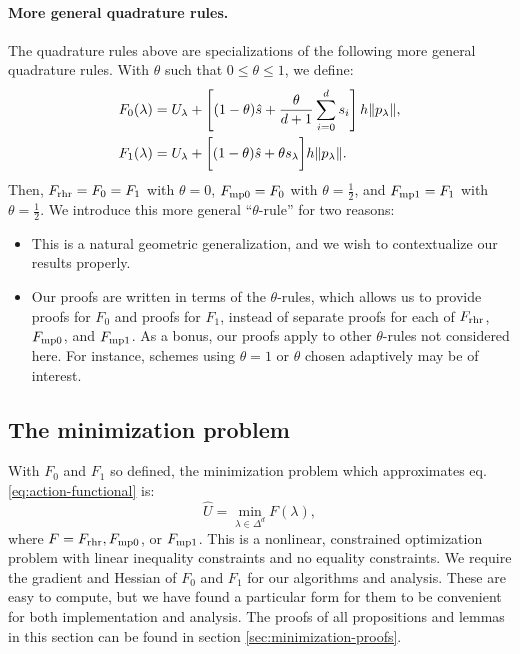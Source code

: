 \documentclass[smallcondensed]{svjour3}
\begin{document}
\paragraph{More general quadrature rules.} The quadrature rules above
are specializations of the following more general quadrature
rules. With $\theta$ such that $0 \leq \theta \leq 1$, we define:
\begin{align}
  F_0(\lambda) &= U_\lambda + \left[(1 - \theta)\hat{s} + \frac{\theta}{d+1} \sum_{i=0}^d s_i\right] h \|p_\lambda\|, \\
  F_1(\lambda) &= U_\lambda + \bigg[ (1 - \theta)\hat{s} + \theta s_\lambda \bigg] h \|p_\lambda\|.
\end{align}
Then, $F_{\operatorname{rhr}} = F_0 = F_1$ with $\theta = 0$, $F_{\operatorname{mp0}} = F_0$ with
$\theta = \tfrac{1}{2}$, and $F_{\operatorname{mp1}} = F_1$ with
$\theta = \tfrac{1}{2}$. We introduce this more general
``$\theta$-rule'' for two reasons:
\begin{itemize}
\item This is a natural geometric generalization, and we wish
  to contextualize our results properly.
\item Our proofs are written in terms of the $\theta$-rules, which
  allows us to provide proofs for $F_0$ and proofs for $F_1$, instead
  of separate proofs for each of $F_{\operatorname{rhr}}$, $F_{\operatorname{mp0}}$, and
  $F_{\operatorname{mp1}}$. As a bonus, our proofs apply to other $\theta$-rules not
  considered here. For instance, schemes using $\theta = 1$ or
  $\theta$ chosen adaptively may be of interest.
\end{itemize}

\subsection{The minimization problem}\label{ssec:minimization-problem}

With $F_0$ and $F_1$ so defined, the minimization problem which
approximates eq.\@ \ref{eq:action-functional} is:
\begin{equation}
  \label{eq:constrained-minimization}
  \hat{U} = \min_{\lambda \in \Delta^d} F(\lambda),
\end{equation}
where $F = F_{\operatorname{rhr}}, F_{\operatorname{mp0}}$, or $F_{\operatorname{mp1}}$. This is a nonlinear,
constrained optimization problem with linear inequality constraints
and no equality constraints. We require the gradient and Hessian of
$F_0$ and $F_1$ for our algorithms and analysis. These are easy to
compute, but we have found a particular form for them to be convenient
for both implementation and analysis. The proofs of all propositions
and lemmas in this section can be found in section\@
\ref{sec:minimization-proofs}.
\end{document}
